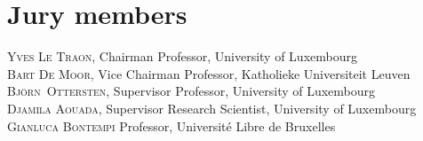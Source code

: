 
\chapter*{Jury members}


\noindent \textsc{Yves Le Traon}, Chairman \newline
Professor, University of Luxembourg \\

\noindent \textsc{Bart De Moor}, Vice Chairman \newline
Professor, Katholieke Universiteit Leuven \\

\noindent \textsc{Bj\"orn~Ottersten}, Supervisor \newline
Professor, University of Luxembourg\\

\noindent \textsc{Djamila Aouada}, Supervisor \newline
Research Scientist, University of Luxembourg\\

\noindent \textsc{Gianluca Bontempi} \newline
Professor, Université Libre de Bruxelles\\


